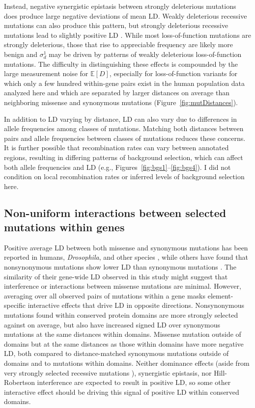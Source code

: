 \documentclass[]{article}
\newcommand{\E}{\mathbb{E}}
\begin{document}
Instead, negative synergistic epistasis between strongly deleterious mutations
does produce large negative deviations of mean LD. Weakly deleterious
recessive mutations can also produce this pattern, but strongly deleterious
recessive mutations lead to slightly positive LD \citep{Roze2021-cf}. While
most loss-of-function mutations are strongly deleterious, those that rise to
appreciable frequency are likely more benign and \(\sigma_d^1\) may be driven
by patterns of weakly deleterious loss-of-function mutations. The difficulty in
distinguishing these effects is compounded by the large measurement noise for
\(\E[D]\), especially for loss-of-function variants for which only a few
hundred within-gene pairs exist in the human population data analyzed here and
which are separated by larger distances on average than neighboring missense
and synonymous mutations (Figure~\ref{fig:mutDistances}).

In addition to LD varying by distance, LD can also vary due to differences in
allele frequencies among classes of mutations. Matching both distances between pairs
and allele frequencies between classes of mutations reduces these
concerns. It is further possible that recombination rates can vary between annotated
regions, resulting in differing patterns of background selection, which can
affect both allele frequencies and LD (e.g.,
Figures~\ref{fig:bgs1}--\ref{fig:bgs4}). I did not condition on local
recombination rates or inferred levels of background selection here.

\subsection{Non-uniform interactions between selected mutations within genes}

Positive average LD between both missense and synonymous mutations has been
reported in humans, \emph{Drosophila}, and other species
\citep{Sohail2017-zq,Sandler2021-of}, while others have found that
nonsynonymous mutations show lower LD than synonymous mutations
\citep{Garcia2021-zn}. The similarity of their gene-wide LD observed in this
study might suggest that interference or interactions
between missense mutations are minimal.
However, averaging over all observed pairs of
mutations within a gene masks element-specific interactive effects that drive
LD in opposite directions. Nonsynonymous mutations found within conserved
protein domains are more strongly selected
against on average, but also have increased signed LD over synonymous mutations
at the same distances within domains. Missense mutation outside of domains but
at the same distances as those within domains have more negative LD, both
compared to distance-matched synonymous mutations outside of domains and to
mutations within domains. Neither dominance effects (aside from very strongly
selected recessive mutations \citep{Roze2021-cf}), synergistic epistasis, nor
Hill-Robertson interference are expected to result in positive LD, so some
other interactive effect should be driving this signal of positive LD within
conserved domains.
\end{document}
